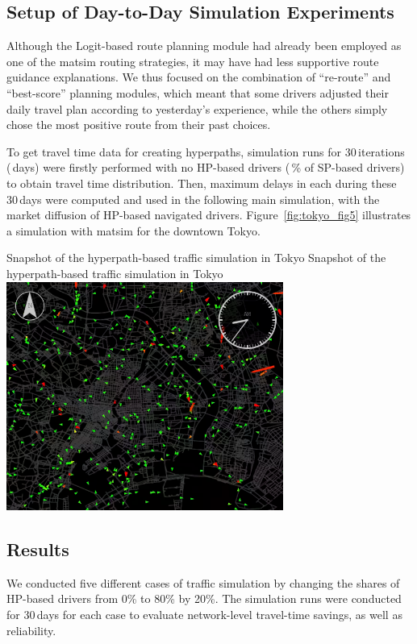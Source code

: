 \subsection{Setup of Day-to-Day Simulation Experiments}
Although the Logit-based route planning module had already been employed as one of the \gls{matsim} routing strategies, it may have had less supportive route guidance explanations. We thus focused on the combination of ``re-route'' and ``best-score'' planning modules, which meant that some drivers adjusted their daily travel plan according to yesterday's experience, while the others simply chose the most positive route from their past choices. 

To get travel time data for creating hyperpaths, simulation runs for 30\,iterations (\,days) were firstly performed with no HP-based drivers (\,\% of SP-based drivers) to obtain travel time distribution. Then, maximum delays in each during these 30\,days were computed and used in the following main simulation, with the market diffusion of HP-based navigated drivers. Figure~\ref{fig:tokyo_fig5} illustrates a simulation with \gls{matsim} for the downtown Tokyo. 

\createfigure%
{Snapshot of the hyperpath-based traffic simulation in Tokyo}%
{Snapshot of the hyperpath-based traffic simulation in Tokyo}%
{\label{fig:tokyo_fig5}}%
{\includegraphics[width=0.68\textwidth, angle=0]{./scenarios/figures/tokyo_fig5.png}}%
{}

\subsection{Results}
We conducted five different cases of traffic simulation by changing the shares of HP-based drivers from 0\% to 80\% by 20\%. The simulation runs were conducted for 30\,days for each case to evaluate network-level travel-time savings, as well as reliability. 

